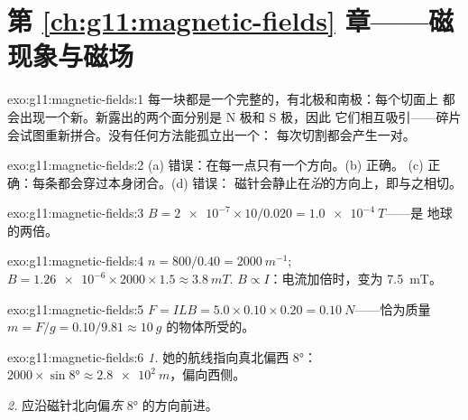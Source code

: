 \section*{第 \ref{ch:g11:magnetic-fields} 章——磁现象与磁场}

\begin{solution}{exo:g11:magnetic-fields:1}
每一块都是一个完整的，有北极和南极：每个切面上
都会出现一个新。新露出的两个面分别是 N 极和 S 极，因此
它们相互吸引——碎片会试图重新拼合。没有任何方法能孤立出一个：
每次切割都会产生一对。
\end{solution}

\begin{solution}{exo:g11:magnetic-fields:2}
(a) 错误：在每一点只有一个方向。(b) 正确。
(c) 正确：每条都会穿过本身闭合。(d) 错误：
磁针会静止在\emph{沿}的方向上，即与之相切。
\end{solution}

\begin{solution}{exo:g11:magnetic-fields:3}
$B = \num{2e-7} \times 10 / 0.020 = \qty{1.0e-4}{T}$——是
地球的两倍。
\end{solution}

\begin{solution}{exo:g11:magnetic-fields:4}
$n = 800/0.40 = \qty{2000}{m^{-1}}$;
$B = \num{1.26e-6} \times 2000 \times 1.5 \approx \qty{3.8}{mT}$.
$B \propto I$：电流加倍时，变为 \qty{7.5}{mT}。
\end{solution}

\begin{solution}{exo:g11:magnetic-fields:5}
$F = ILB = 5.0 \times 0.10 \times 0.20 = \qty{0.10}{N}$——恰为质量
$m = F/g = 0.10/9.81 \approx \qty{10}{g}$ 的物体所受的。
\end{solution}

\begin{solution}{exo:g11:magnetic-fields:6}
\emph{1.} 她的航线指向真北偏西 $\ang{8}$：
$2000 \times \sin\ang{8} \approx \qty{2.8e2}{m}$，偏向西侧。

\emph{2.} 应沿磁针北向偏\emph{东} $\ang{8}$ 的方向前进。
\end{solution}

